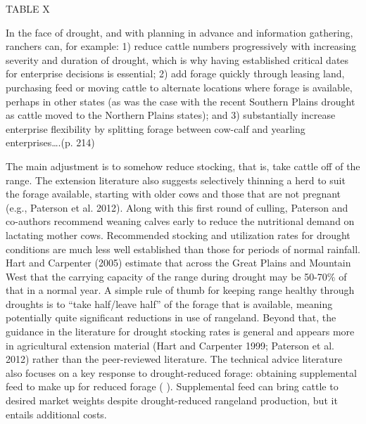\documentclass[11pt]{article}
\begin{document}
TABLE X

In the face of drought, and with planning in advance and information gathering, ranchers can, for example:
1) reduce cattle numbers progressively with increasing severity and duration of drought, which is why having established critical dates for enterprise decisions is essential; 2) add forage quickly through leasing land, purchasing feed or moving cattle to alternate locations where forage is available, perhaps in other states (as was the case with the recent Southern Plains drought as cattle moved to the Northern Plains states); and 3) substantially increase enterprise flexibility by splitting forage between cow-calf and yearling enterprises….(p. 214)

The main adjustment is to somehow reduce stocking, that is, take cattle off of the range. The extension literature also suggests selectively thinning a herd to suit the forage available, starting with older cows and those that are not pregnant (e.g., Paterson et al. 2012). Along with this first round of culling, Paterson and co-authors recommend weaning calves early to reduce the nutritional demand on lactating mother cows. Recommended stocking and utilization rates for drought conditions are much less well established than those for periods of normal rainfall. Hart and Carpenter (2005) estimate that across the Great Plains and Mountain West that the carrying capacity of the range during drought may be 50-70\% of that in a normal year. A simple rule of thumb for keeping range healthy through droughts is to “take half/leave half” of the forage that is available, meaning potentially quite significant reductions in use of rangeland. Beyond that, the guidance in the literature for drought stocking rates is general and appears more in agricultural extension material (Hart and Carpenter 1999; Paterson et al. 2012) rather than the peer-reviewed literature. The technical advice literature also focuses on a key response to drought-reduced forage: obtaining supplemental feed to make up for reduced forage (   ). Supplemental feed can bring cattle to desired market weights despite drought-reduced rangeland production, but it entails additional costs. 
\end{document}
